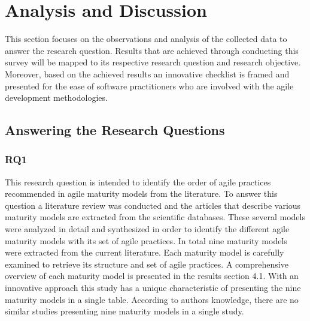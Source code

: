 \documentclass[a4paper,oneside]{bth}
\begin{document}
\chapter{Analysis and Discussion}
This section focuses on the observations and analysis of the collected data to answer the research question. Results that are achieved through conducting this survey will be mapped to its respective research question and research objective. Moreover, based on the achieved results an innovative checklist is framed and presented for the ease of software practitioners who are involved with the agile development methodologies.
\section{Answering the Research Questions}
\subsection{RQ1}
This research question is intended to identify the order of agile practices recommended in agile maturity models from the literature. To answer this question a literature review was conducted and the articles that describe various maturity models are extracted from the scientific databases. These several models were analyzed in detail and synthesized in order to identify the different agile maturity models with its set of agile practices. In total nine maturity models were extracted from the current literature. Each maturity model is carefully examined to retrieve its structure and set of agile practices. A comprehensive overview of each maturity model is presented in the results section 4.1. With an innovative approach this study has a unique characteristic of presenting the nine maturity models in a single table. According to authors knowledge, there are no similar studies presenting nine maturity models in a single study.
\end{document}
